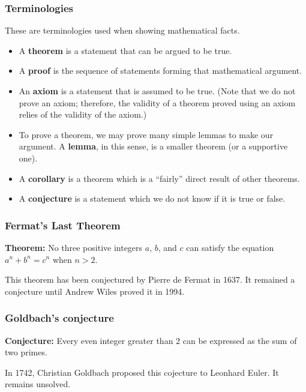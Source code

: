 

\begin{frame}\frametitle{Terminologies}
  These are terminologies used when showing mathematical facts.
  \begin{itemize}
  \item A {\bf theorem} is a statement that can be argued to be true.
  \item A {\bf proof} is the sequence of statements forming that
    mathematical argument.
    \pause
  \item An {\bf axiom} is a statement that is assumed to be true.
    (Note that we do not prove an axiom; therefore, the validity of a
    theorem proved using an axiom relies of the validity of the
    axiom.)
    \pause
  \item To prove a theorem, we may prove many simple lemmas to make
    our argument.  A {\bf lemma}, in this sense, is a smaller theorem
    (or a supportive one).
    \pause
  \item A {\bf corollary} is a theorem which is a ``fairly'' direct
    result of other theorems.
    \pause
  \item A {\bf conjecture} is a statement which we do not know if it
    is true or false.
  \end{itemize}
\end{frame}

\begin{frame}\frametitle{Fermat's Last Theorem}
  \begin{tcolorbox}
    {\bf Theorem:} No three positive integers $a$, $b$, and $c$ can satisfy the equation $a^n+b^n=c^n$ when $n>2$.
  \end{tcolorbox}

  This theorem has been conjectured by Pierre de Fermat in 1637.  It
  remained a conjecture until Andrew Wiles proved it in 1994.
\end{frame}

\begin{frame}\frametitle{Goldbach's conjecture}
  \begin{tcolorbox}
    {\bf Conjecture:} Every even integer greater than $2$ can be
    expressed as the sum of two primes.
  \end{tcolorbox}

  In 1742, Christian Goldbach proposed this cojecture to Leonhard
  Euler.  It remains unsolved.
\end{frame}

